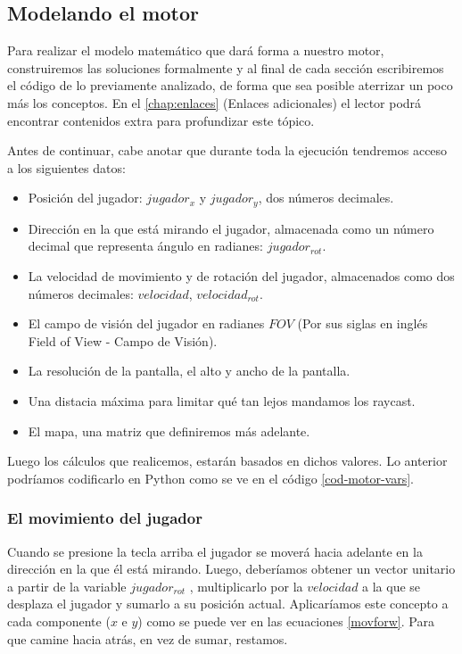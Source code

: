 \subsection{Modelando el motor}

Para realizar el modelo matemático que dará forma a nuestro motor, construiremos las soluciones formalmente y al final de cada sección escribiremos el código de lo previamente analizado, de forma que sea posible aterrizar un poco más los conceptos. En el \autoref{chap:enlaces} (Enlaces adicionales) el lector podrá encontrar contenidos extra para profundizar este tópico.

Antes de continuar, cabe anotar que durante toda la ejecución tendremos acceso a los siguientes datos:

\begin{itemize}
	\item Posición del jugador: $jugador_x$ y $jugador_y$, dos números decimales.
	\item Dirección en la que está mirando el jugador, almacenada como un número decimal que representa ángulo en radianes: $jugador_{rot}$.
	\item La velocidad de movimiento y de rotación del jugador, almacenados como dos números decimales: $velocidad$,  $velocidad_{rot}$. 
	\item El campo de visión del jugador en radianes $FOV$ (Por sus siglas en inglés Field of View - Campo de Visión).
	\item La resolución de la pantalla, el alto y ancho de la pantalla.
	\item Una distacia máxima para limitar qué tan lejos mandamos los raycast.
	\item El mapa, una matriz que definiremos más adelante.
\end{itemize}

Luego los cálculos que realicemos, estarán basados en dichos valores. Lo anterior podríamos codificarlo en Python como se ve en el código \ref{cod-motor-vars}.



\subsubsection{El movimiento del jugador}

Cuando se presione la tecla arriba el jugador se moverá hacia adelante en la dirección en la que él está mirando. Luego, deberíamos obtener un vector unitario a partir de la variable $jugador_{rot}$ , multiplicarlo por la $velocidad$ a la que se desplaza el jugador y sumarlo a su posición actual. Aplicaríamos este concepto a cada componente ($x$ e $y$) como se puede ver en las ecuaciones \ref{movforw}. Para que camine hacia atrás, en vez de sumar, restamos. 

